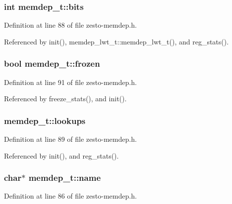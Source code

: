 \subsubsection[{bits}]{\setlength{\rightskip}{0pt plus 5cm}int {\bf memdep\_\-t::bits}\hspace{0.3cm}{\tt  [protected]}}\label{classmemdep__t_1ace19a7514c1042b4c33bdf6eab3360}




Definition at line 88 of file zesto-memdep.h.

Referenced by init(), memdep\_\-lwt\_\-t::memdep\_\-lwt\_\-t(), and reg\_\-stats().
\subsubsection[{frozen}]{\setlength{\rightskip}{0pt plus 5cm}bool {\bf memdep\_\-t::frozen}\hspace{0.3cm}{\tt  [protected]}}\label{classmemdep__t_452b897e1055c0c1d70e197066b5d3a1}




Definition at line 91 of file zesto-memdep.h.

Referenced by freeze\_\-stats(), and init().
\subsubsection[{lookups}]{ {\bf memdep\_\-t::lookups}\hspace{0.3cm}{\tt  [protected]}}\label{classmemdep__t_afce3c6cc59995888583a99be3ee3ffc}




Definition at line 89 of file zesto-memdep.h.

Referenced by init(), and reg\_\-stats().
\subsubsection[{name}]{\setlength{\rightskip}{0pt plus 5cm}char$\ast$ {\bf memdep\_\-t::name}\hspace{0.3cm}{\tt  [protected]}}\label{classmemdep__t_37071ab6d0d3e5f794bd3a8dcd6bda72}




Definition at line 86 of file zesto-memdep.h.

